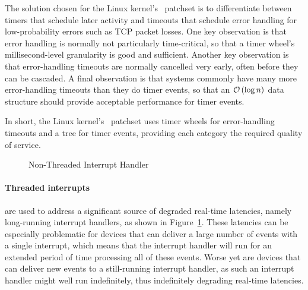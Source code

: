 The solution chosen for the Linux kernel's \rt\ patchset is to differentiate
between timers that schedule later activity and timeouts that schedule
error handling for low-probability errors such as TCP packet losses.
One key observation is that error handling is normally not particularly
time-critical, so that a timer wheel's millisecond-level granularity
is good and sufficient.
Another key observation is that error-handling timeouts are normally
cancelled very early, often before they can be cascaded.
A final observation is that systems commonly have many more error-handling
timeouts than they do timer events, so that an $\mathcal{O}\left(\log n\right)$
data structure should provide acceptable performance for timer events.

In short, the Linux kernel's \rt\ patchset uses timer wheels for
error-handling timeouts and a tree for timer events, providing each
category the required quality of service.

\begin{figure}[tb]
\centering
{}
\caption{Non-Threaded Interrupt Handler}
\label{fig:advsync:Non-Threaded Interrupt Handler}
\end{figure}

\paragraph{Threaded interrupts}
are used to address a significant source of degraded real-time latencies,
namely long-running interrupt handlers,
as shown in
Figure~\ref{fig:advsync:Non-Threaded Interrupt Handler}.
These latencies can be especially problematic for devices that can
deliver a large number of events with a single interrupt, which means
that the interrupt handler will run for an extended period of time
processing all of these events.
Worse yet are devices that can deliver new events to a still-running
interrupt handler, as such an interrupt handler might well run
indefinitely, thus indefinitely degrading real-time latencies.

